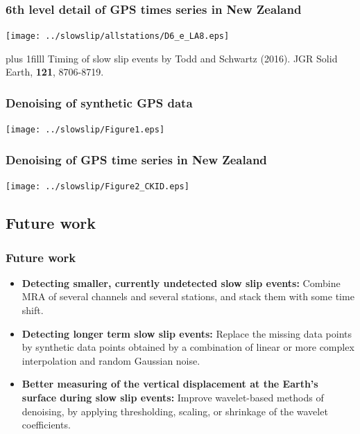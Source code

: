 \documentclass{beamer}
\newcommand{\btVFill}{\vskip0pt plus 1filll}
\begin{document}
	\begin{frame}
		\frametitle{6th level detail of GPS times series in New Zealand}
		\begin{center}
			\texttt{[image: ../slowslip/allstations/D6\_e\_LA8.eps]}
		\end{center}
		\btVFill
		\tiny{Timing of slow slip events by Todd and Schwartz (2016). JGR Solid Earth, \textbf{121}, 8706-8719.}
	\end{frame}

	\begin{frame}
		\frametitle{Denoising of synthetic GPS data}
		\begin{center}
			\texttt{[image: ../slowslip/Figure1.eps]}
		\end{center}
	\end{frame}

	\begin{frame}
		\frametitle{Denoising of GPS time series in New Zealand}
		\begin{center}
			\texttt{[image: ../slowslip/Figure2\_CKID.eps]}
		\end{center}
	\end{frame}


	\subsection{Future work}

	\begin{frame}
		\frametitle{Future work}
		\begin{itemize}
			\item \textbf{Detecting smaller, currently undetected slow slip events:} Combine MRA of several channels and several stations, and stack them with some time shift.
			\item \textbf{Detecting longer term slow slip events:} Replace the missing data points by synthetic data points obtained by a combination of linear or more complex interpolation and random Gaussian noise.
			\item \textbf{Better measuring of the vertical displacement at the Earth’s surface during slow slip events:} Improve wavelet-based methods of denoising, by applying thresholding, scaling, or shrinkage of the wavelet coefficients.
		\end{itemize}
	\end{frame}
\end{document}
